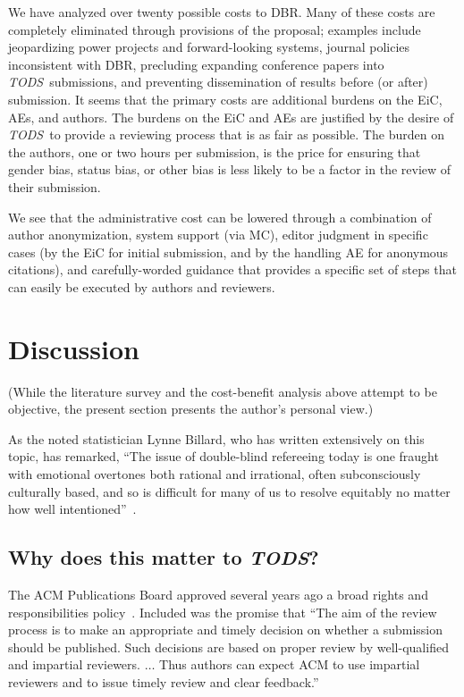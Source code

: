 \documentclass[acmtods,acmnow]{acmtrans2m}
\newcommand{\tods}{{\em TODS\/}}
\begin{document}
We have analyzed over twenty possible costs to DBR. Many of these costs
are completely eliminated through provisions of the proposal; examples
include jeopardizing power projects and forward-looking systems, journal
policies inconsistent with DBR, precluding expanding conference papers into
\tods\ submissions, and preventing dissemination of results before (or
after) submission. It seems that the primary costs are additional burdens on
the EiC, AEs, and authors. The burdens on the EiC and AEs are justified by
the desire of \tods\ to provide a reviewing process that is as fair as
possible. The burden on the authors, one or two hours per submission, is the
price for ensuring that gender bias, status bias, or other bias is less
likely to be a factor in the review of their submission.

We see that the administrative cost can be lowered through a combination of
author anonymization, system support (via MC), editor judgment in specific
cases (by the EiC for initial submission, and by the handling AE for
anonymous citations), and carefully-worded guidance that provides a specific
set of steps that can easily be executed by authors and reviewers.

\section{Discussion}
(While the literature survey and the cost-benefit analysis above attempt to be
objective, the present section presents the author's personal view.)

As the noted statistician Lynne Billard, who has written extensively on this
topic, has remarked, ``The issue of double-blind refereeing today is one
fraught with emotional overtones both rational and irrational, often
subconsciously culturally based, and so is difficult for many of us to
resolve equitably no matter how well intentioned''~\cite[page
320]{billard93}.


\subsection{Why does this matter to \tods?}

The ACM Publications Board approved several years ago a broad rights and
responsibilities policy~\cite{ACMPubs,SnodgrassCACM}. Included was the
promise that ``The aim of the review process is to make an appropriate and
timely decision on whether a submission should be published. Such decisions
are based on proper review by well-qualified and impartial
reviewers. $\ldots$ Thus authors can expect ACM to use impartial reviewers
and to issue timely review and clear feedback.''
\end{document}
